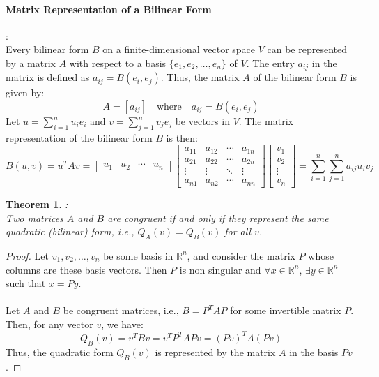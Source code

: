 \documentclass[11pt]{book} %
\newtheorem{theorem}{Theorem}[section]
\begin{document}
\paragraph{Matrix Representation of a Bilinear Form}: \\ 
Every bilinear form \( B \) on a finite-dimensional vector space \( V \) can be represented by a matrix \( A \) with respect to a basis 
\( \{e_1, e_2, \dots, e_n\} \) of \( V \). 
The entry \( a_{ij} \) in the matrix is defined as \( a_{ij} = B(e_i, e_j) \). Thus, the matrix \( A \) of the bilinear form \( B \) is given by:
\[
A = [a_{ij}] \quad \text{where} \quad a_{ij} = B(e_i, e_j)
\]
Let \( u = \sum_{i=1}^n u_i e_i \) and \( v = \sum_{j=1}^n v_j e_j \) be vectors in \( V \). The matrix representation of the bilinear form \( B \) is then:
\[
B(u, v) = u^T A v 
= \begin{bmatrix} u_1 & u_2 & \cdots & u_n \end{bmatrix} \begin{bmatrix} a_{11} & a_{12} & \cdots & a_{1n} \\ a_{21} & a_{22} & \cdots & a_{2n} \\ \vdots & \vdots & \ddots & \vdots \\ a_{n1} & a_{n2} & \cdots & a_{nn} \end{bmatrix} \begin{bmatrix} v_1 \\ v_2 \\ \vdots \\ v_n \end{bmatrix}
= \sum_{i=1}^n \sum_{j=1}^n a_{ij} u_i v_j
\]


\begin{theorem}{:} \\
    Two matrices \( A \) and \( B \) are congruent if and only if they represent the same quadratic (bilinear) form, i.e., \( Q_A(v) = Q_B(v) \) for all \( v \).
\end{theorem}

\begin{proof} 
    Let $v_1, v_2, \ldots, v_n$ be some basis in $\mathbb{R}^n$, and consider the matrix $P$ whose columns are these basis vectors. 
    Then $P$ is non singular and $\forall x \in \mathbb{R}^n$, $\exists y \in \mathbb{R}^n$ such that $x = Py$. \\
    \\
    Let \( A \) and \( B \) be congruent matrices, i.e., \( B = P^T A P \) for some invertible matrix \( P \). 
    Then, for any vector \( v \), we have:
    \[
    Q_B(v) = v^T B v = v^T P^T A P v = (Pv)^T A (Pv) 
    \]
    Thus, the quadratic form \( Q_B(v) \) is represented by the matrix \( A \) in the basis \( Pv \). 
\end{proof}
\end{document}

